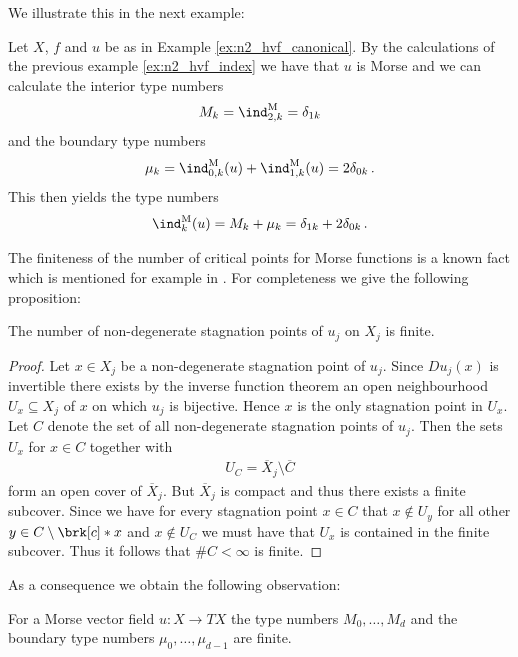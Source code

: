 We illustrate this in the next example:
\begin{example}
  Let $X$, $f$ and $u$ be as in Example \ref{ex:n2_hvf_canonical}. By the calculations of the previous example
  \ref{ex:n2_hvf_index} we have that $u$ is Morse and we can calculate the interior type numbers
  \begin{align*}
    M_k=\ind^\text{M}_{2,k}=\delta_{1k}
  \end{align*}
  and the boundary type numbers
  \begin{align*}
    \mu_k=\ind^\text{M}_{0,k}(u)+\ind^\text{M}_{1,k}(u)=2\delta_{0k}\,.
  \end{align*}
  This then yields the type numbers
  \begin{align*}
    \ind^\text{M}_k(u)=M_k+\mu_k=\delta_{1k}+2\delta_{0k}\,.
  \end{align*}
\end{example}

The finiteness of the number of critical points for Morse functions is a known fact which is mentioned
for example in \cite{Morse1970}. For completeness we give the following proposition:
\begin{proposition}\label{pr:finiteness_critical_points}
  The number of non-degenerate
  stagnation points of $u_j$ on $X_j$ is finite.
\end{proposition}
\begin{proof}
  Let $x\in X_j$ be a non-degenerate stagnation point of $u_j$. Since $Du_j(x)$ is invertible there exists
  by the inverse function theorem an open neighbourhood $U_x\subseteq X_j$ of $x$ on which 
  $u_j$ is bijective. Hence $x$ is the only stagnation point in $U_x$. Let $C$ denote the set of all
  non-degenerate stagnation points of $u_j$. Then the sets $U_x$ for $x\in C$ together with
  \begin{align}
    U_C=\overline{X}_j\setminus \overline{C}
  \end{align}
  form an open cover of $\overline{X}_j$. But $\overline{X}_j$ is compact and thus there exists
  a finite subcover. Since we have for every stagnation point $x\in C$ that
  $x\not\in U_y$ for all other $y\in C\setminus\brk[c]*{x}$ and $x\not\in U_C$ we must have that $U_x$
  is contained in the finite subcover. Thus it follows that $\#C<\infty$ is finite.
\end{proof}
As a consequence we obtain the following observation:
\begin{corollary}\label{co:finiteness_type_nbrs}
  For a Morse vector field $u\colon X\to TX$ the type numbers $M_0,\dots,M_d$ and the boundary type numbers $\mu_0,\dots,\mu_{d-1}$
  are finite.
\end{corollary}

